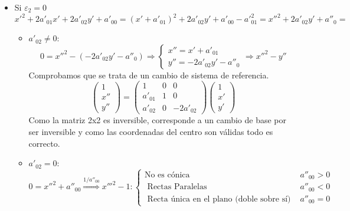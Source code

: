 \documentclass[10pt,a4paper,openright]{book}
\theoremstyle{break}
\begin{document}
\begin{itemize}
\item Si $\varepsilon_2 = 0$
$$x'^2 + 2 a'_{01} x' + 2  a'_{02}y' + a'_{00} = (x' + a'_{01} )^2 + 2  a'_{02}y'  + a'_{00}- a'^2_{01} = x''^2 + 2  a'_{02}y'  + a''_0 = $$
	\begin{itemize}
	\item $ a'_{02} \neq 0$:
	$$ 0 = x''^2 - (-2  a'_{02}y'  - a''_0)  \Rightarrow \begin{cases}
x'' = x' + a'_{01} \\ y'' = -2  a'_{02}y'  - a''_0
\end{cases} \Rightarrow x''^2 - y'' $$
Comprobamos que se trata de un cambio de sistema de referencia.
$$\begin{pmatrix}
1 \\ x'' \\ y''
\end{pmatrix} =
\left(\begin{array}{c|cc}
1 & 0 & 0 \\
\hline
a'_{01} & 1  & 0  \\
a'_{02} &  0 & - 2 a'_{02}
\end{array}
\right)
\begin{pmatrix}
1 \\ x' \\ y'
\end{pmatrix}$$
Como la matriz 2x2 es inversible, corresponde a un cambio de base por ser inversible y como las coordenadas del centro son válidas todo es correcto.

 	\item $a'_{02} = 0$:
 	$$0 = x''^2 + a''_{00} \stackrel{1/a''_{00}}{\Rightarrow} x'''^2 - 1 : \begin{cases} \mbox{No es cónica} & a''_{00} > 0 \\
\mbox{ Rectas Paralelas } & a''_{00} < 0 \\
\mbox{ Recta única en el plano (doble sobre sí) } &a''_{00} = 0\end{cases}$$
	\end{itemize}
\end{itemize}
\end{document}
